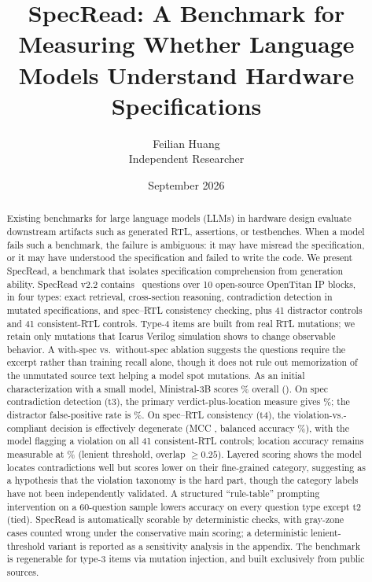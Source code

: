 \documentclass[11pt]{article}
\title{SpecRead: A Benchmark for Measuring Whether Language Models Understand Hardware Specifications}
\author{Feilian Huang\\Independent Researcher}
\date{September 2026}
\begin{document}

\maketitle

\begin{abstract}
Existing benchmarks for large language models (LLMs) in hardware design evaluate downstream artifacts such as generated RTL, assertions, or testbenches. When a model fails such a benchmark, the failure is ambiguous: it may have misread the specification, or it may have understood the specification and failed to write the code. We present SpecRead, a benchmark that isolates specification comprehension from generation ability. SpecRead v2.2 contains \NTotal\ questions over 10 open-source OpenTitan IP blocks, in four types: exact retrieval, cross-section reasoning, contradiction detection in mutated specifications, and spec--RTL consistency checking, plus 41 distractor controls and 41 consistent-RTL controls. Type-4 items are built from real RTL mutations; we retain only mutations that Icarus Verilog simulation shows to change observable behavior. A with-spec vs.\ without-spec ablation suggests the questions require the excerpt rather than training recall alone, though it does not rule out memorization of the unmutated source text helping a model spot mutations. As an initial characterization with a small model, Ministral-3B scores \ConsAccoverall\% overall (\ConsToverall). On spec contradiction detection (t3), the primary verdict-plus-location measure gives \ConsAccVLTthree\%; the distractor false-positive rate is \DistrAccFPR\%. On spec--RTL consistency (t4), the violation-vs.-compliant decision is effectively degenerate (MCC \DecMCC, balanced accuracy \DecBalAcc\%), with the model flagging a violation on all 41 consistent-RTL controls; location accuracy remains measurable at \LayAccTfourLoc\% (lenient threshold, overlap $\ge 0.25$). Layered scoring shows the model locates contradictions well but scores lower on their fine-grained category, suggesting as a hypothesis that the violation taxonomy is the hard part, though the category labels have not been independently validated. A structured ``rule-table'' prompting intervention on a 60-question sample lowers accuracy on every question type except t2 (tied). SpecRead is automatically scorable by deterministic checks, with gray-zone cases counted wrong under the conservative main scoring; a deterministic lenient-threshold variant is reported as a sensitivity analysis in the appendix. The benchmark is regenerable for type-3 items via mutation injection, and built exclusively from public sources.
\end{abstract}
\end{document}
